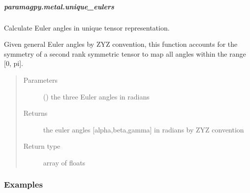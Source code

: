 \documentclass[a4paper,10pt,english]{sphinxmanual}
\begin{document}
\subparagraph{paramagpy.metal.unique\_eulers}
\label{\detokenize{reference/generated/paramagpy.metal.unique_eulers:paramagpy-metal-unique-eulers}}\label{\detokenize{reference/generated/paramagpy.metal.unique_eulers::doc}}

\begin{fulllineitems}
\label{\detokenize{reference/generated/paramagpy.metal.unique_eulers:paramagpy.metal.unique_eulers}}
Calculate Euler angles in unique tensor representation.

Given general Euler angles by ZYZ convention, this function accounts for
the symmetry of a second rank symmetric tensor to map all angles within
the range {[}0, pi{]}.
\begin{quote}\begin{description}
\item[{Parameters}] \leavevmode
{} () \textendash{} the three Euler angles in radians

\item[{Returns}] \leavevmode
{} \textendash{} the euler angles {[}alpha,beta,gamma{]} in radians
by ZYZ convention

\item[{Return type}] \leavevmode
array of floats

\end{description}\end{quote}
\subsubsection*{Examples}

%
\begin{sphinxVerbatim}[commandchars=\\\{\}]
  \PYG{p}{[}\PYG{p}{]}
\end{sphinxVerbatim}

\end{fulllineitems}
\end{document}
